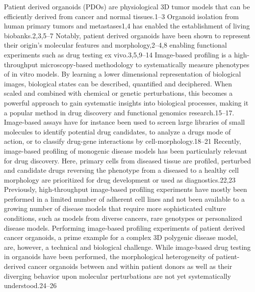 \begin{flushleft}
Patient derived organoids (PDOs) are physiological 3D tumor models that can be efficiently derived from cancer and normal tissues.1–3 Organoid isolation from human primary tumors and metastases1,4 has enabled the establishment of living biobanks.2,3,5–7 Notably, patient derived organoids have been shown to represent their origin’s molecular features and morphology,2–4,8 enabling functional experiments such as drug testing ex vivo.3,5,9–14 
Image-based profiling is a high-throughput microscopy-based methodology to systematically measure phenotypes of in vitro models. By learning a lower dimensional representation of biological images, biological states can be described, quantified and deciphered. When scaled and combined with chemical or genetic perturbations, this becomes a powerful approach to gain systematic insights into biological processes, making it a popular method in drug discovery and functional genomics research.15–17. Image-based assays have for instance been used to screen large libraries of small molecules to identify potential drug candidates, to analyze a drugs mode of action, or to classify drug-gene interactions by cell-morphology.18–21 Recently, image-based profiling of monogenic disease models has been particularly relevant for drug discovery. Here, primary cells from diseased tissue are profiled, perturbed and candidate drugs reversing the phenotype from a diseased to a healthy cell morphology are prioritized for drug development or used as diagnostics.22,23
Previously, high-throughput image-based profiling experiments have mostly been performed in a limited number of adherent cell lines and not been available to a growing number of disease models that require more sophisticated culture conditions, such as models from diverse cancers, rare genotypes or personalized disease models. Performing image-based profiling experiments of patient derived cancer organoids, a prime example for a complex 3D polygenic disease model, are, however, a technical and biological challenge. While image-based drug testing in organoids have been performed, the morphological heterogeneity of patient-derived cancer organoids between and within patient donors as well as their diverging behavior upon molecular perturbations are not yet systematically understood.24–26

\end{flushleft}
